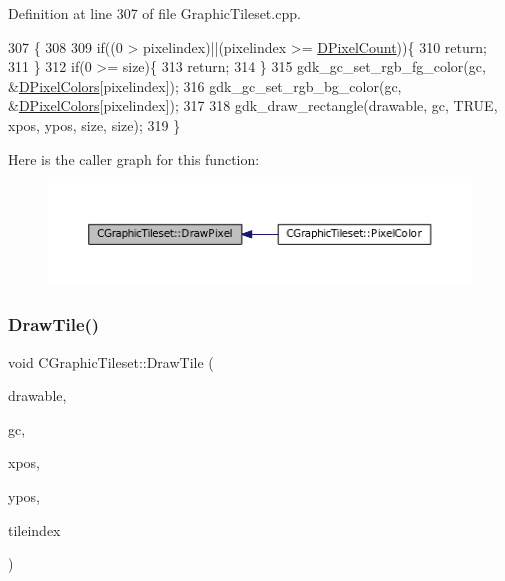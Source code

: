 Definition at line 307 of file Graphic\+Tileset.\+cpp.


\begin{DoxyCode}
307                                                                                                            
          \{
308 
309     \textcolor{keywordflow}{if}((0 > pixelindex)||(pixelindex >= \hyperlink{classCGraphicTileset_a55fc9ceb1c92383c124e61c911fe57db}{DPixelCount}))\{
310         \textcolor{keywordflow}{return};
311     \}
312     \textcolor{keywordflow}{if}(0 >= size)\{
313         \textcolor{keywordflow}{return};
314     \}
315     gdk\_gc\_set\_rgb\_fg\_color(gc, &\hyperlink{classCGraphicTileset_a4e9672b8b133dbac600fb8bb400d1cb3}{DPixelColors}[pixelindex]);
316     gdk\_gc\_set\_rgb\_bg\_color(gc, &\hyperlink{classCGraphicTileset_a4e9672b8b133dbac600fb8bb400d1cb3}{DPixelColors}[pixelindex]);
317     
318     gdk\_draw\_rectangle(drawable, gc, TRUE, xpos, ypos, size, size);
319 \}
\end{DoxyCode}
Here is the caller graph for this function\+:\nopagebreak
\begin{figure}[H]
\begin{center}
\leavevmode
\includegraphics[width=350pt]{classCGraphicTileset_a8acad7ebeb4fad53a72681851f323812_icgraph}
\end{center}
\end{figure}
\hypertarget{classCGraphicTileset_afefd501a74e95295b7cd2dc868dcbbcb}{}\label{classCGraphicTileset_afefd501a74e95295b7cd2dc868dcbbcb} 
\subsubsection{\texorpdfstring{Draw\+Tile()}{DrawTile()}}
{\footnotesize\ttfamily void C\+Graphic\+Tileset\+::\+Draw\+Tile (\begin{DoxyParamCaption}\item[{Gdk\+Drawable $\ast$}]{drawable,  }\item[{Gdk\+GC $\ast$}]{gc,  }\item[{gint}]{xpos,  }\item[{gint}]{ypos,  }\item[{int}]{tileindex }\end{DoxyParamCaption})}




